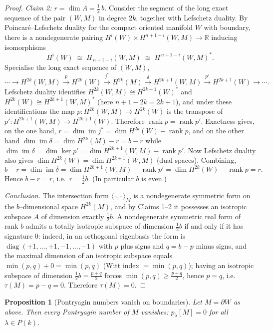 \documentclass[12pt]{article}
\newtheorem{proposition}{Proposition}
\theoremstyle{definition}
\begin{document}
\begin{proof}
\noindent\emph{Claim 2: $r=\dim A=\tfrac12\,b$.}\;
Consider the segment of the long exact sequence of the pair $(W,M)$ in degree $2k$,
together with Lefschetz duality.  By Poincar\'e--Lefschetz duality for the compact
oriented manifold $W$ with boundary, there is a nondegenerate pairing
$H^{i}(W)\times H^{n+1-i}(W,M)\to\mathbb R$ inducing isomorphisms
\[
H^{i}(W)\;\cong\;H_{\,n+1-i}(W,M)\;\cong\;H^{\,n+1-i}(W,M)^\ast .
\]
Specialise the long exact sequence of $(W,M)$,
\[
\cdots\to H^{2k}(W,M)\xrightarrow{\;p\;}H^{2k}(W)\xrightarrow{\;j^\ast\;}
H^{2k}(M)\xrightarrow{\;\delta\;}H^{2k+1}(W,M)\xrightarrow{\;p'\;}H^{2k+1}(W)\to\cdots .
\]
Lefschetz duality identifies $H^{2k}(W,M)\cong H^{2k+1}(W)^\ast$ and
$H^{2k}(W)\cong H^{2k+1}(W,M)^\ast$ (here $n+1-2k=2k+1$), and under these identifications
the map $p\colon H^{2k}(W,M)\to H^{2k}(W)$ is the transpose of
$p'\colon H^{2k+1}(W,M)\to H^{2k+1}(W)$.  Therefore
$\operatorname{rank}p=\operatorname{rank}p'$.  Exactness gives, on the one hand,
$r=\dim\operatorname{im}j^\ast=\dim H^{2k}(W)-\operatorname{rank}p$, and on the other hand
$\dim\operatorname{im}\delta=\dim H^{2k}(M)-r=b-r$ while
$\dim\operatorname{im}\delta=\dim\ker p'=\dim H^{2k+1}(W,M)-\operatorname{rank}p'$.  Now
Lefschetz duality also gives $\dim H^{2k}(W)=\dim H^{2k+1}(W,M)$ (dual spaces).  Combining,
\[
b-r=\dim\operatorname{im}\delta=\dim H^{2k+1}(W,M)-\operatorname{rank}p'
=\dim H^{2k}(W)-\operatorname{rank}p=r .
\]
Hence $b-r=r$, i.e.\ $r=\tfrac12 b$.  (In particular $b$ is even.)
\smallskip

\noindent\emph{Conclusion.}  The intersection form $\langle\,\cdot,\cdot\,\rangle_M$ is a
nondegenerate symmetric form on the $b$--dimensional space $H^{2k}(M)$, and by Claims 1--2
it possesses an isotropic subspace $A$ of dimension exactly $\tfrac12 b$.  A
nondegenerate symmetric real form of rank $b$ admits a totally isotropic subspace of
dimension $\tfrac12 b$ if and only if it has signature $0$: indeed, in an orthogonal
eigenbasis the form is $\operatorname{diag}(+1,\dots,+1,-1,\dots,-1)$ with $p$ plus signs
and $q=b-p$ minus signs, and the maximal dimension of an isotropic subspace equals
$\min(p,q)+0=\min(p,q)$ \big(Witt index $=\min(p,q)$\big); having an isotropic subspace of
dimension $\tfrac12 b=\tfrac{p+q}2$ forces $\min(p,q)\ge\tfrac{p+q}2$, hence $p=q$, i.e.\
$\tau(M)=p-q=0$.  Therefore $\tau(M)=0$.
\end{proof}

\begin{proposition}[Pontryagin numbers vanish on boundaries]\label{prop:pnbdy}
Let $M=\partial W$ as above.  Then every Pontryagin number of $M$ vanishes:
$p_\lambda[M]=0$ for all $\lambda\in P(k)$.
\end{proposition}
\end{document}
